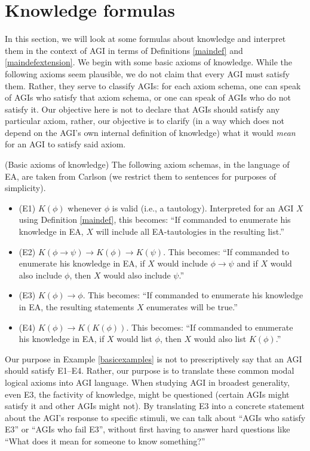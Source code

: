 \documentclass[runningheads]{llncs}
\begin{document}
\section{Knowledge formulas}
\label{appsection}

In this section, we will look at some formulas about knowledge and interpret them in the
context of AGI in terms of Definitions \ref{maindef} and \ref{maindefextension}.
We begin with some basic axioms of knowledge. While the following axioms seem plausible,
we do not claim that every AGI must satisfy them. Rather, they serve to classify AGIs:
for each axiom schema, one can speak of AGIs who satisfy that axiom schema, or one can
speak of AGIs who do not satisfy it. Our objective here is not to declare that AGIs
should satisfy any particular axiom, rather, our objective is to clarify (in a way which
does not depend on the AGI's own internal definition of knowledge) what it would
\emph{mean} for an AGI to satisfy said axiom.

\begin{example}
\label{basicexamples}
  (Basic axioms of knowledge) The following axiom schemas, in the language
  of EA, are taken from Carlson \cite{carlson}
  (we restrict them to sentences for purposes of simplicity).
  \begin{itemize}
    \item (E1) $K(\phi)$ whenever $\phi$ is valid (i.e., a tautology).
    Interpreted for an AGI $X$ using Definition \ref{maindef}, this becomes:
    ``If commanded to enumerate his knowledge in EA, $X$ will include
    all EA-tautologies in the resulting list.''
    \item (E2) $K(\phi\rightarrow\psi)\rightarrow K(\phi)\rightarrow K(\psi)$.
    This becomes: ``If commanded to enumerate his knowledge in EA,
    if $X$ would include $\phi\rightarrow\psi$ and if $X$ would also include
    $\phi$, then $X$ would also include $\psi$.''
    \item (E3) $K(\phi)\rightarrow\phi$. This becomes: ``If commanded to enumerate
    his knowledge in EA, the resulting statements $X$ enumerates
    will be true.''
    \item (E4) $K(\phi)\rightarrow K(K(\phi))$. This becomes: ``If commanded to
    enumerate his knowledge in EA, if $X$ would list $\phi$,
    then $X$ would also list $K(\phi)$.''
  \end{itemize}
\end{example}

Our purpose in Example \ref{basicexamples} is not to prescriptively say that an
AGI should satisfy E1--E4. Rather, our purpose is to translate these common
modal logical axioms into AGI language. When studying AGI in broadest generality,
even E3, the factivity of knowledge, might be questioned (certain AGIs might satisfy
it and other AGIs might not). By translating E3 into
a concrete statement about the AGI's response to specific stimuli,
we can talk about ``AGIs who satisfy E3'' or
``AGIs who fail E3'', without first having to answer hard questions
like ``What does it mean for someone to know something?''
\end{document}
